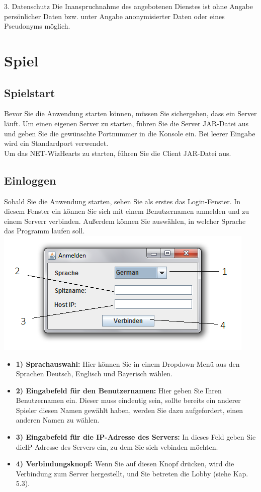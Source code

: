 \documentclass[titlepage,10pt,a4paper]{article}
\begin{document}
3. Datenschutz
Die Inanspruchnahme des angebotenen Dienstes ist ohne Angabe persönlicher Daten bzw. unter Angabe anonymisierter Daten oder eines Pseudonyms möglich.
\\

\section{Spiel}
\subsection{Spielstart}
Bevor Sie die Anwendung starten können, müssen Sie sichergehen, dass ein \gls{Server} läuft. Um einen eigenen \gls{Server} zu starten, führen Sie die \gls{Server} JAR-Datei aus und geben Sie die gewünschte Portnummer in die Konsole ein. Bei leerer Eingabe wird ein Standardport verwendet.\\
Um das NET-WizHearts zu starten, führen Sie die Client JAR-Datei aus.\\

\subsection{Einloggen}
Sobald Sie die Anwendung starten, sehen Sie als erstes das Login-Fenster. In diesem Fenster ein können Sie sich mit einem Benutzernamen anmelden und zu einem \gls{Server}r verbinden. Außerdem können Sie auswählen, in welcher Sprache das Programm laufen soll.\\
\includegraphics[width=\textwidth]{Login-Fenster}
\begin{itemize}
	\item \textbf{1) Sprachauswahl:} Hier können Sie in einem Dropdown-Menü aus den Sprachen Deutsch, Englisch und Bayerisch wählen.
	\item \textbf{2) Eingabefeld für den Benutzernamen:} Hier geben Sie Ihren Benutzernamen ein. Dieser muss eindeutig sein, sollte bereits ein anderer Spieler diesen Namen gewählt haben, werden Sie dazu aufgefordert, einen anderen Namen zu wählen.
	\item \textbf{3) Eingabefeld für die \gls{IP-Adresse} des \gls{Server}s:} In dieses Feld geben Sie die\gls{IP-Adresse} des \gls{Server}s ein, zu dem Sie sich vebinden möchten.
	\item \textbf{4) Verbindungsknopf:} Wenn Sie auf diesen Knopf drücken, wird die Verbindung zum \gls{Server} hergestellt, und Sie betreten die \gls{Lobby} (siehe Kap. 5.3).
\end{itemize}
\end{document}

